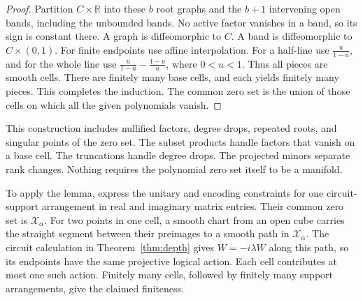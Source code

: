 \documentclass[aps,prl,reprint,notitlepage,nofootinbib,nobibnotes]{revtex4-2}
\begin{document}
\begin{proof}
Partition \(C\times\mathbb R\) into these \(b\) root graphs and the
\(b+1\) intervening open bands, including the unbounded bands.
No active factor vanishes in a band, so its sign is constant there.
A graph is diffeomorphic to \(C\). A band is diffeomorphic to
\(C\times(0,1)\). For finite endpoints use affine interpolation.
For a half-line use \(\frac{u}{1-u}\), and for the whole line use
\(\frac{u}{1-u}-\frac{1-u}{u}\), where \(0<u<1\).
Thus all pieces are smooth cells. There are finitely many base cells,
and each yields finitely many pieces. This completes the induction. The common zero set is the union of those cells on which
all the given polynomials vanish.
\end{proof}

This construction includes nullified factors, degree drops, repeated
roots, and singular points of the zero set. The subset products handle
factors that vanish on a base cell. The truncations handle degree drops.
The projected minors separate rank changes. Nothing requires the
polynomial zero set itself to be a manifold.

To apply the lemma, express the unitary and encoding constraints
for one circuit-support arrangement in real and imaginary matrix
entries. Their common zero set is \(\mathcal X_\alpha\).
For two points in one cell, a smooth chart from an open cube carries
the straight segment between their preimages to a smooth path in
\(\mathcal X_\alpha\). The circuit calculation in Theorem~\ref{thm:depth}
gives \(\dot W=-i\lambda W\) along this path, so its endpoints have the
same projective logical action. Each cell contributes at most one such
action. Finitely many cells, followed by finitely many support
arrangements, give the claimed finiteness.
\end{document}
